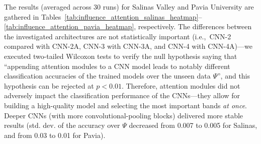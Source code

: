 \documentclass[journal]{IEEEtran}
\newcommand{\TestSet}{\Psi}
\begin{document}
The results (averaged across 30 runs) for Salinas Valley and Pavia University are gathered in Tables~\ref{tab:influence_attention_salinas_heatmap}--\ref{tab:influence_attention_pavia_heatmap}, respectively. The differences between the investigated architectures are not statistically important (i.e.,~CNN-2 compared with CNN-2A, CNN-3 with CNN-3A, and CNN-4 with CNN-4A)---we executed two-tailed Wilcoxon tests to verify the null hypothesis saying that ``appending attention modules to a CNN model leads to notably different classification accuracies of the trained models over the unseen data $\TestSet$'', and this hypothesis can be rejected at $p<0.01$. Therefore, attention modules did not adversely impact the classification performance of the CNNs---they allow for building a high-quality model and selecting the most important bands \emph{at once}. Deeper CNNs (with more convolutional-pooling blocks) delivered more stable results (std. dev. of the accuracy over $\TestSet$ decreased from 0.007 to 0.005 for Salinas, and from 0.03 to 0.01 for Pavia).
\end{document}
